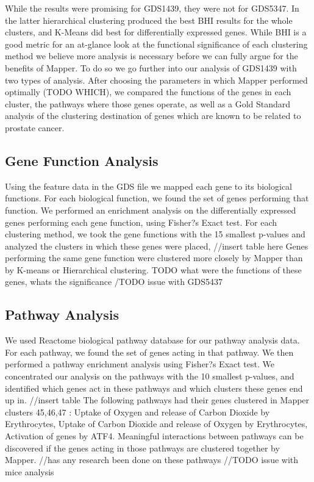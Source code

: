 \documentclass[preprint,10pt]{elsarticle}
\begin{document}
While the results were promising for GDS1439, they were not for GDS5347. In the latter hierarchical clustering produced the best BHI results for the whole clusters, and K-Means did best for differentially expressed genes. While BHI is a good metric for an at-glance look at the functional significance of each clustering method we believe more analysis is necessary before we can fully argue for the benefits of Mapper. To do so we go further into our analysis of GDS1439 with two types of analysis. After choosing the parameters in which Mapper performed optimally (TODO WHICH), we compared the functions of the genes in each cluster, the pathways where those genes operate, as well as a Gold Standard analysis of the clustering destination of genes which are known to be related to prostate cancer. 



\subsection{Gene Function Analysis}
Using the feature data in the GDS file we mapped each gene to its biological functions. For each biological function, we found the set of genes performing that function. We performed an enrichment analysis on the differentially expressed genes performing each gene function, using Fisher?s Exact test. For each clustering method, we took the gene functions with the 15 smallest p-values and analyzed the clusters in which these genes were placed,
//insert table here
Genes performing the same gene function were clustered more closely by Mapper than by K-means or Hierarchical clustering. 
TODO what were the functions of these genes, whats the significance
/TODO issue with GDS5437

\subsection{Pathway Analysis}
	We used Reactome biological pathway database for our pathway analysis data. For each pathway, we found the set of genes acting in that pathway. We then performed a pathway enrichment analysis using Fisher?s Exact test. We concentrated our analysis on the pathways with the 10 smallest p-values, and identified which genes act in these pathways and which clusters these genes end up in.
//insert table
The following pathways had their genes clustered in Mapper clusters 45,46,47 : Uptake of Oxygen and release of Carbon Dioxide by Erythrocytes, Uptake of Carbon Dioxide and release of Oxygen by Erythrocytes, Activation of genes by ATF4. Meaningful interactions between pathways can be discovered if the genes acting in those pathways are clustered together by Mapper.
//has any research been done on these pathways
//TODO issue with mice analysis
\end{document}
